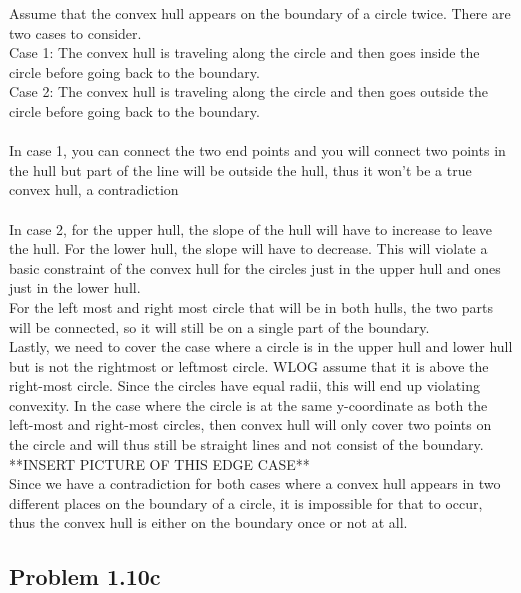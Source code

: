 \documentclass[11pt,psfig]{article}
\begin{document}
Assume that the convex hull appears on the boundary of a circle twice. There are two cases to consider.\\
Case 1: The convex hull is traveling along the circle and then goes inside the circle before going back to the boundary. \\
Case 2: The convex hull is traveling along the circle and then goes outside the circle before going back to the boundary.\\
\\
In case 1, you can connect the two end points and you will connect two points in the hull but part of the line will be outside the hull, thus it won't be a true convex hull, a contradiction\\
\\
In case 2, for the upper hull, the slope of the hull will have to increase to leave the hull. For the lower hull, the slope will have to decrease. This will violate a basic constraint of the convex hull for the circles just in the upper hull and ones just in the lower hull. \\
For the left most and right most circle that will be in both hulls, the two parts will be connected, so it will still be on a single part of the boundary.\\
Lastly, we need to cover the case where a circle is in the upper hull and lower hull but is not the rightmost or leftmost circle. WLOG assume that it is above the right-most circle. Since the circles have equal radii, this will end up violating convexity. In the case where the circle is at the same y-coordinate as both the left-most and right-most circles, then convex hull will only cover two points on the circle and will thus still be straight lines and not consist of the boundary.
\\
**INSERT PICTURE OF THIS EDGE CASE**
\\
Since we have a contradiction for both cases where a convex hull appears in two different places on the boundary of a circle, it is impossible for that to occur, thus the convex hull is either on the boundary once or not at all. 

\subsection*{Problem 1.10c}
\end{document}
